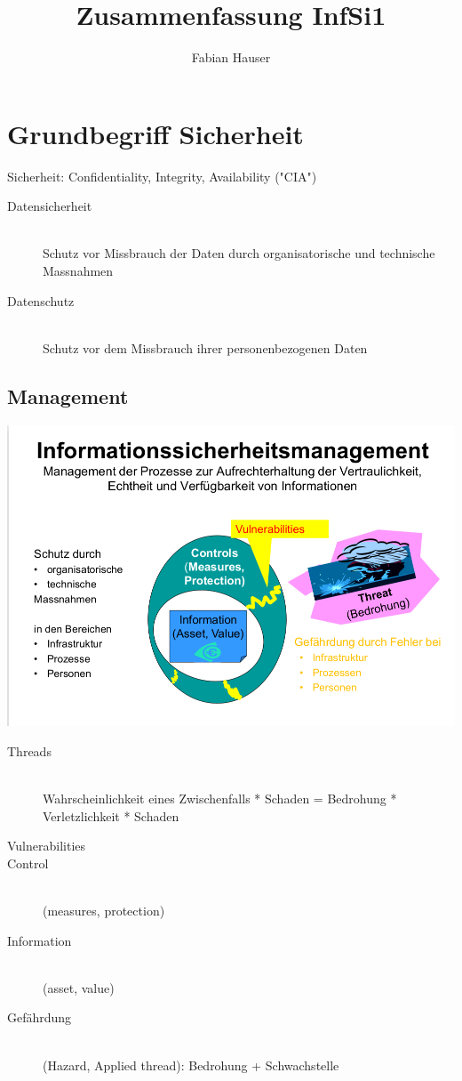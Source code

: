 

\title{Zusammenfassung InfSi1}
\author{Fabian Hauser}
 

\maketitle

\section{Grundbegriff Sicherheit}

Sicherheit: Confidentiality, Integrity, Availability ("CIA")

\begin{description}
\item[Datensicherheit] \hfill \\
	Schutz vor Missbrauch der Daten durch organisatorische und technische Massnahmen
\item[Datenschutz] \hfill \\
	Schutz vor dem Missbrauch ihrer personenbezogenen Daten
\end{description}

\subsection{Management}
\includegraphics[scale=0.25]{img/informationssicherheitsmanagement.png}

\begin{description}
\item[Threads] \hfill \\
	Wahrscheinlichkeit eines Zwischenfalls * Schaden = Bedrohung * Verletzlichkeit * Schaden
\item[Vulnerabilities]
\item[Control] \hfill \\
	(measures, protection)
\item[Information] \hfill \\
	(asset, value)
\item[Gefährdung] \hfill \\
	(Hazard, Applied thread): Bedrohung + Schwachstelle
\end{description}


